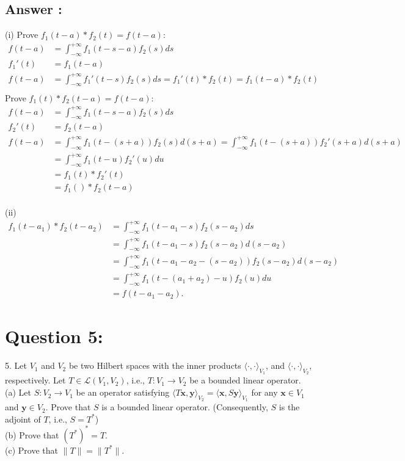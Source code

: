 \documentclass[a4paper,12pt]{article}
\begin{document}
\subsection*{Answer :}
(i) 
Prove \(f_1(t - a) * f_2(t) = f(t - a)\):
\begin{align*}
    f(t - a) &= \int_{-\infty}^{+\infty}f_1(t - s - a)f_2(s)ds \\
    f_1'(t) &= f_1(t - a) \\
    f(t - a) &= \int_{-\infty}^{+\infty}f_1'(t - s)f_2(s)ds = f_1'(t)*f_2(t) = f_1(t - a)*f_2(t) \\
\end{align*}
Prove \(f_1(t) * f_2(t - a) = f(t - a)\):
\begin{align*}
    f(t - a) &= \int_{-\infty}^{+\infty}f_1(t - s - a)f_2(s)ds \\
    f_2'(t) &= f_2(t - a) \\
    f(t - a) &= \int_{-\infty}^{+\infty}f_1(t - (s+a))f_2(s)d(s + a) = \int_{-\infty}^{+\infty}f_1(t - (s+a))f_2'(s + a)d(s + a) \\
    &= \int_{-\infty}^{+\infty}f_1(t - u)f_2'(u)du \\
    &= f_1(t)*f_2'(t)  \\
    &= f_1()*f_2(t-a) \\
\end{align*}

\vspace{1cm}
\noindent
(ii)
\begin{align*}
    f_1(t-a_1) * f_2(t-a_2) &= \int_{-\infty}^{+\infty}f_1(t-a_1 - s)f_2(s-a_2)ds\\
    &= \int_{-\infty}^{+\infty}f_1(t-a_1 - s)f_2(s-a_2)d(s - a_2) \\
    &= \int_{-\infty}^{+\infty}f_1(t-a_1 - a_2 - (s - a_2))f_2(s-a_2)d(s - a_2) \\
    &= \int_{-\infty}^{+\infty}f_1(t-(a_1 + a_2) - u)f_2(u)du \\
    &=f(t-a_1-a_2).
\end{align*}

\section*{Question 5:}
5. Let \(V_1\) and \(V_2\) be two Hilbert spaces with the inner products \(\langle \cdot, \cdot \rangle_{V_1}\), and \(\langle \cdot, \cdot\rangle_{V_2}\), respectively.
Let \(T \in \mathcal{L}(V_1, V_2)\), i.e., \(T: V_1 \to V_2\) be a bounded linear operator. \\
(a) Let \(S:V_2 \to V_1\) be an operator satisfying \(\langle T\bm{x}, \bm{y}\rangle_{V_2} = \langle \bm{x}, S\bm{y}\rangle_{V_1}\) for any \(\bm{x} \in V_1\) and \(\bm{y} \in V_2\).
Prove that \(S\) is a bounded linear operator. (Consequently, \(S\) is the adjoint of \(T\), i.e., \(S = T^*\)) \\
(b) Prove that \((T^*)^* = T\). \\
(c) Prove that \(\|T\| = \|T^*\|\).
\end{document}

